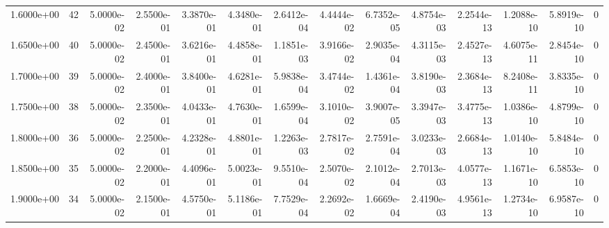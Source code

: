 \begin{tabular}{rrrrrrrrrrrrrr}
1.6000e+00 & 42 & 5.0000e-02 & 2.5500e-01 & 3.3870e-01 & 4.3480e-01 & 2.6412e-04 & 4.4444e-02 & 6.7352e-05 & 4.8754e-03 & 2.2544e-13 & 1.2088e-10 & 5.8919e-10 & 0 \\
1.6500e+00 & 40 & 5.0000e-02 & 2.4500e-01 & 3.6216e-01 & 4.4858e-01 & 1.1851e-03 & 3.9166e-02 & 2.9035e-04 & 4.3115e-03 & 2.4527e-13 & 4.6075e-11 & 2.8454e-10 & 0 \\
1.7000e+00 & 39 & 5.0000e-02 & 2.4000e-01 & 3.8400e-01 & 4.6281e-01 & 5.9838e-04 & 3.4744e-02 & 1.4361e-04 & 3.8190e-03 & 2.3684e-13 & 8.2408e-11 & 3.8335e-10 & 0 \\
1.7500e+00 & 38 & 5.0000e-02 & 2.3500e-01 & 4.0433e-01 & 4.7630e-01 & 1.6599e-04 & 3.1010e-02 & 3.9007e-05 & 3.3947e-03 & 3.4775e-13 & 1.0386e-10 & 4.8799e-10 & 0 \\
1.8000e+00 & 36 & 5.0000e-02 & 2.2500e-01 & 4.2328e-01 & 4.8801e-01 & 1.2263e-03 & 2.7817e-02 & 2.7591e-04 & 3.0233e-03 & 2.6684e-13 & 1.0140e-10 & 5.8484e-10 & 0 \\
1.8500e+00 & 35 & 5.0000e-02 & 2.2000e-01 & 4.4096e-01 & 5.0023e-01 & 9.5510e-04 & 2.5070e-02 & 2.1012e-04 & 2.7013e-03 & 4.0577e-13 & 1.1671e-10 & 6.5853e-10 & 0 \\
1.9000e+00 & 34 & 5.0000e-02 & 2.1500e-01 & 4.5750e-01 & 5.1186e-01 & 7.7529e-04 & 2.2692e-02 & 1.6669e-04 & 2.4190e-03 & 4.9561e-13 & 1.2734e-10 & 6.9587e-10 & 0 \\
\bottomrule
\end{tabular}
